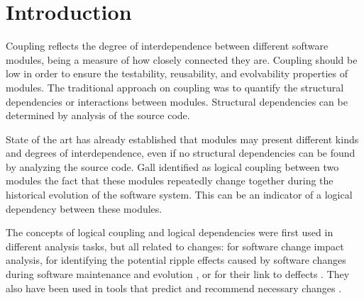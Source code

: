 \documentclass[conference]{IEEEtran}
\begin{document}



\section{Introduction}
\label{sec:intro}

Coupling reflects the degree of interdependence between different software modules, being a measure of how closely connected they are. Coupling should be low in order to ensure the testability, reusability, and evolvability properties of modules.  The traditional approach on coupling was to quantify the structural dependencies or interactions between modules. Structural dependencies can be determined by analysis of the source code.
   
State of the art has already established that modules may present different kinds and degrees of interdependence, even if no structural dependencies can be found by analyzing the source code. Gall \cite{Gall:1998:DLC:850947.853338} identified as logical coupling between two modules the fact that these modules repeatedly change together during the historical evolution of the software system. This can be an indicator of a logical dependency between these modules.

The concepts of logical coupling and logical dependencies were first used in different analysis tasks, but all related to changes: for software change impact analysis, for identifying the potential ripple effects caused by software changes during software maintenance and evolution \cite{DBLP:conf/issre/OlivaG15}, or for their link to deffects \cite{wiese}.  They also have been used in tools that predict and recommend necessary changes \cite{Zimmermann:2004:MVH:998675.999460}. 
\end{document}
